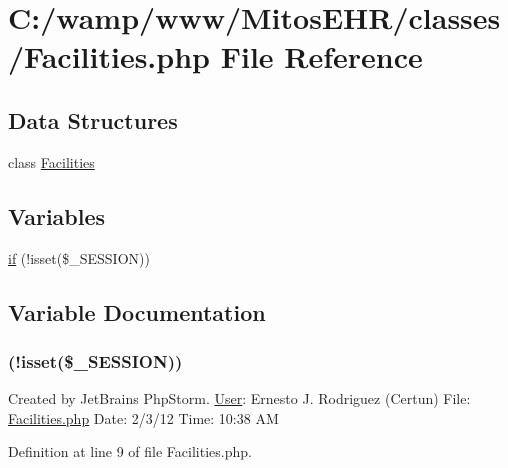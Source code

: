 \hypertarget{_facilities_8php}{\section{\-C\-:/wamp/www/\-Mitos\-E\-H\-R/classes/\-Facilities.php \-File \-Reference}
\label{_facilities_8php}
}
\subsection*{\-Data \-Structures}
\begin{DoxyCompactItemize}
\item 
class \hyperlink{class_facilities}{\-Facilities}
\end{DoxyCompactItemize}
\subsection*{\-Variables}
\begin{DoxyCompactItemize}
\item 
\hyperlink{_facilities_8php_a8ceca98aa29914fd2479a84a8d2242fb}{if} (!isset(\$\-\_\-\-S\-E\-S\-S\-I\-O\-N))
\end{DoxyCompactItemize}


\subsection{\-Variable \-Documentation}
\hypertarget{_facilities_8php_a8ceca98aa29914fd2479a84a8d2242fb}{
\subsubsection[{if}]{(!isset(\$\-\_\-\-S\-E\-S\-S\-I\-O\-N))}}\label{_facilities_8php_a8ceca98aa29914fd2479a84a8d2242fb}
\-Created by \-Jet\-Brains \-Php\-Storm. \hyperlink{class_user}{\-User}\-: \-Ernesto \-J. \-Rodriguez (\-Certun) \-File\-: \hyperlink{_facilities_8php}{\-Facilities.\-php} \-Date\-: 2/3/12 \-Time\-: 10\-:38 \-A\-M 

\-Definition at line 9 of file \-Facilities.\-php.

